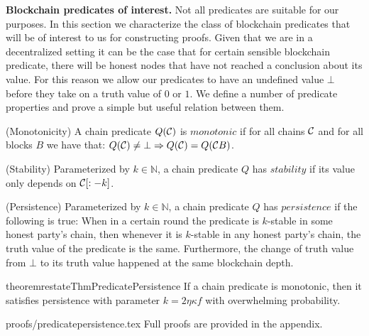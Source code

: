 

\medskip
\noindent 
{\bf Blockchain predicates of interest.}
Not all predicates are suitable for our purposes. In this section we characterize the class of
blockchain predicates that will be of interest to us for constructing proofs.
Given that we are in a decentralized setting it can be the case that for certain
sensible blockchain predicate, there will be honest nodes that have not reached
a conclusion about its value. For this reason we allow our predicates to have an
undefined value $\bot$ before they take on a truth value of $0$ or $1$. We
define a number of predicate properties and prove a simple but useful relation
between them.

\begin{definition}{(Monotonicity)}
    A chain predicate $Q(\mathcal{C})$ is $\textit{monotonic}$ if for all chains
    $\mathcal{C}$ and for all blocks $B$ we have that:
    $Q(\mathcal{C}) \neq \bot \Rightarrow Q(\mathcal{C}) = Q(\mathcal{C} B)$.

\noindent 
 {(Stability)}
    Parameterized by $k \in \mathbb{N}$, a chain predicate
    $Q$ has $\textit{stability}$ if its value only depends on $\mathcal{C}[:-k]$.

\noindent 
{(Persistence)}
    Parameterized by $k \in \mathbb{N}$, a chain predicate
    $Q$ has $\textit{persistence}$ if the following is true: When in a certain
    round the predicate is $k$-stable in some honest party's chain, then
    whenever it is $k$-stable in any honest party's chain, the truth value of
    the predicate is the same. Furthermore, the change of truth value from
    $\bot$ to its  truth value happened at the same blockchain depth.
\end{definition}

\begin{restatable}{theorem}{restateThmPredicatePersistence}
    If a chain predicate is monotonic, then it satisfies persistence with
    parameter $k = 2\eta \kappa f$ with overwhelming probability.
\end{restatable}
\ifonecolumn
    {proofs/predicatepersistence.tex}
\else
    Full proofs are provided in the appendix.
\fi
